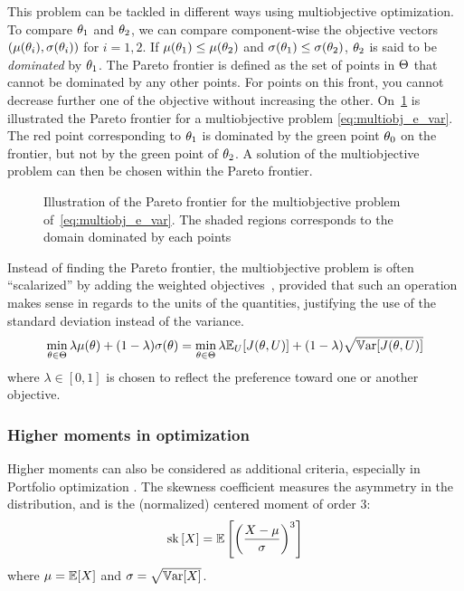 \documentclass[../../Main_ManuscritThese.tex]{subfiles}
\newcommand\imgpath{/home/victor/acadwriting/Manuscrit/Text/Chapter3/img/}
\begin{document}
This problem can be tackled in different ways using multiobjective optimization.
To compare $\theta_1$ and $\theta_2$, we can compare component-wise the objective vectors $(\mu(\theta_i),\sigma(\theta_i))$ for $i=1,2$. If $\mu(\theta_1) \leq \mu(\theta_2)$ and $\sigma(\theta_1) \leq \sigma(\theta_2)$, $\theta_2$ is said to be \emph{dominated} by $\theta_1$. The Pareto frontier is defined as the set of points in $\Theta$ that cannot be dominated by any other points. For points on this front, you cannot decrease further one of the objective without increasing the other.
On~\cref{fig:pareto} is illustrated the Pareto frontier for a multiobjective problem \cref{eq:multiobj_e_var}. The red point corresponding to $\theta_1$ is dominated by the green point $\theta_0$ on the frontier, but not by the green point of $\theta_2$. A solution of the multiobjective problem can then be chosen within the Pareto frontier. 

\begin{figure}[ht]
  \label{fig:pareto} 
  \centering
  
  \caption{Illustration of the Pareto frontier for the multiobjective problem of~\cref{eq:multiobj_e_var}. The shaded regions corresponds to the domain dominated by each points}
\end{figure}

Instead of finding the Pareto frontier, the multiobjective problem is often ``scalarized'' by adding the weighted objectives~\cite{marler_weighted_2010}, provided that such an operation makes sense in regards to the units of the quantities, justifying the use of the standard deviation instead of the variance.
\begin{equation}
  \min_{\theta\in\Theta} \lambda \mu(\theta) + (1- \lambda)\sigma(\theta) =   \min_{\theta\in\Theta} \lambda \mathbb{E}_{U}[J(\theta,U)] + (1- \lambda)\sqrt{\mathbb{V}\mathrm{ar}[J(\theta,U)]}
\end{equation}
where $\lambda \in [0,1]$ is chosen to reflect the preference toward one or another objective.

\subsubsection{Higher moments in optimization}
\label{sec:higher_moments}
Higher moments can also be considered as additional criteria, especially in Portfolio optimization \cite{lai_mean-variance-skewness-kurtosis-based_2006,briec_mean-variance-skewness_2007}. 
The skewness coefficient measures the asymmetry in the distribution, and is the (normalized) centered moment of order $3$:
\begin{equation}
  \mathrm{sk}\left[X\right] = \mathbb{E}\left[\left(\frac{X - \mu}{\sigma}\right)^3\right]
\end{equation}
where $\mu = \mathbb{E}[X]$ and $\sigma = \sqrt{\mathbb{V}\mathrm{ar}[X]}$.
\end{document}
